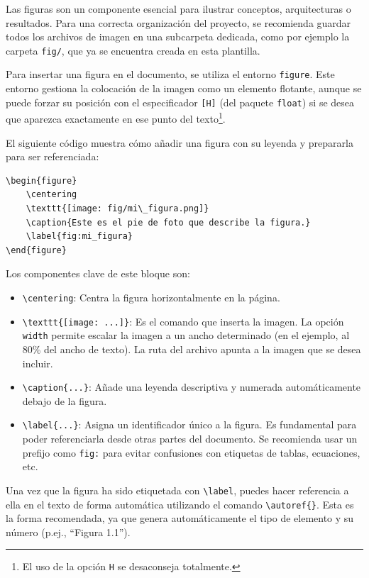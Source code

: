 \documentclass[11pt,a4paper]{book}
\begin{document}
Las figuras son un componente esencial para ilustrar conceptos, arquitecturas o resultados. Para una correcta organización del proyecto, se recomienda guardar todos los archivos de imagen en una subcarpeta dedicada, como por ejemplo la carpeta \texttt{fig/}, que ya se encuentra creada en esta plantilla.

Para insertar una figura en el documento, se utiliza el entorno \texttt{figure}. Este entorno gestiona la colocación de la imagen como un elemento flotante, aunque se puede forzar su posición con el especificador \texttt{[H]} (del paquete \texttt{float}) si se desea que aparezca exactamente en ese punto del texto\footnote{El uso de la opción \texttt{H} se desaconseja totalmente.}.

El siguiente código muestra cómo añadir una figura con su leyenda y prepararla para ser referenciada:

\begin{verbatim}
\begin{figure}
    \centering
    \texttt{[image: fig/mi\_figura.png]}
    \caption{Este es el pie de foto que describe la figura.}
    \label{fig:mi_figura}
\end{figure}
\end{verbatim}

Los componentes clave de este bloque son:
\begin{itemize}
    \item \verb|\centering|: Centra la figura horizontalmente en la página.
    \item \verb|\texttt{[image: ...]}|: Es el comando que inserta la imagen. La opción \texttt{width} permite escalar la imagen a un ancho determinado (en el ejemplo, al 80\% del ancho de texto). La ruta del archivo apunta a la imagen que se desea incluir.
    \item \verb|\caption{...}|: Añade una leyenda descriptiva y numerada automáticamente debajo de la figura.
    \item \verb|\label{...}|: Asigna un identificador único a la figura. Es fundamental para poder referenciarla desde otras partes del documento. Se recomienda usar un prefijo como \texttt{fig:} para evitar confusiones con etiquetas de tablas, ecuaciones, etc.
\end{itemize}

Una vez que la figura ha sido etiquetada con \verb|\label|, puedes hacer referencia a ella en el texto de forma automática utilizando el comando \verb|\autoref{}|. Esta es la forma recomendada, ya que genera automáticamente el tipo de elemento y su número (p.ej., ``Figura 1.1'').
\end{document}
